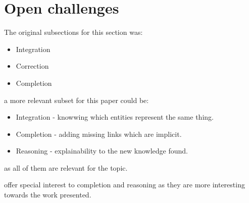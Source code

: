 
\section{Open challenges}\label{sec:kgs-challenges}
The original subsections for this section was:
\begin{itemize}
    \item Integration
    \item Correction
    \item Completion
\end{itemize}

a more relevant subset for this paper could be:

\begin{itemize}
    \item Integration - knowwing which entities represent the same thing.
    \item Completion - adding missing links which are implicit.
    \item Reasoning - explainability to the new knowledge found.
\end{itemize}

as all of them are relevant for the topic.

offer special interest to completion and reasoning as they are more interesting towards the work presented.



